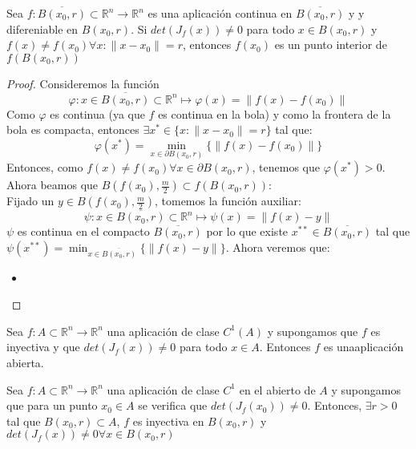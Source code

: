 \begin{teorema}
    Sea $f: \overline{B(x_0, r)} \subset \mathbb{R}^n \to \mathbb{R}^n$ es una aplicación continua en $\overline{B(x_0, r)}$ y y difereniable en $B(x_0, r)$. Si $det(J_f(x)) \neq 0$ para todo $x \in B(x_0, r)$ y $f(x) \neq f(x_0) \forall x : \|x - x_0\| = r$, entonces $f(x_0)$ es un punto interior de $f(B(x_0, r))$
\end{teorema}
\begin{proof}
    Consideremos la función
    $$\varphi: x \in \overline{B(x_0, r)} \subset \mathbb{R}^n \mapsto \varphi(x) = \|f(x) - f(x_0)\|$$
    Como $\varphi$ es continua (ya que $f$ es continua en la bola) y como la frontera de la bola es compacta, entonces $\exists x^* \in \{x : \|x -x_0\| = r\}$ tal que: 
    $$\varphi(x^*) = \min_{x \in \partial B(x_0, r)} \{ \|f(x)-f(x_0)\|\}$$
    Entonces, como $f(x) \neq f(x_0) \forall x \in \partial B(x_0, r)$, tenemos que $\varphi(x^*) > 0$. 
    Ahora beamos que $B(f(x_0), \frac{m}{2}) \subset f(B(x_0, r))$: \\
    Fijado un $y \in B(f(x_0), \frac{m}{2})$, tomemos la función auxiliar:
    $$\psi: x \in \overline{B(x_0, r)} \subset \mathbb{R}^n \mapsto \psi(x) = \|f(x) - y\|$$
    $\psi$ es continua en el compacto $\overline{B(x_0, r)}$ por lo que existe $x^{**} \in \overline{B(x_0, r)}$ tal que $\psi(x^{**}) = \min_{x \in \overline{B(x_0, r)}} \{ \|f(x) - y\|\}$. Ahora veremos que: 
    \begin{itemize}
        \item 
    \end{itemize}
\end{proof}

\begin{corolario}
    Sea $f:A \subset \mathbb{R}^n \to \mathbb{R}^n$ una aplicación de clase $C^1(A)$ y supongamos que $f$ es inyectiva y que $det(J_f(x)) \neq 0$ para todo $x \in A$. Entonces $f$ es unaaplicación abierta.
\end{corolario}

\begin{proposición}
    Sea $f: A \subset \mathbb{R}^n \to \mathbb{R}^n$ una aplicación de clase $C^1$ en el abierto de $A$ y supongamos que para un punto $x_0 \in A$ se verifica que $det(J_f(x_0)) \neq 0$. Entonces, $\exists r > 0$ tal que $B(x_0, r) \subset A$, $f$ es inyectiva en $B(x_0, r)$ y $det(J_f(x)) \neq 0 \forall x \in B(x_0, r)$
\end{proposición}



